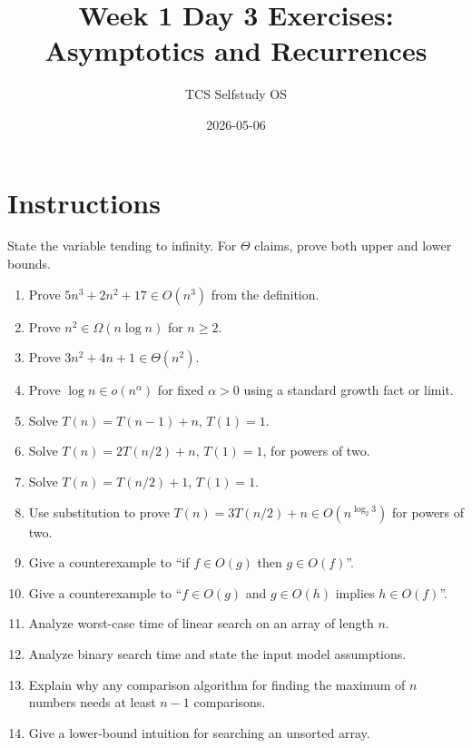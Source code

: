 \documentclass[11pt]{article}
\title{Week 1 Day 3 Exercises: Asymptotics and Recurrences}
\author{TCS Selfstudy OS}
\date{2026-05-06}
\begin{document}
\maketitle

\section*{Instructions}
State the variable tending to infinity. For $\Theta$ claims, prove both upper and lower bounds.

\begin{enumerate}[label=\textbf{D3.\arabic*.}]
\item Prove $5n^3+2n^2+17\in O(n^3)$ from the definition.
\item Prove $n^2\in\Omega(n\log n)$ for $n\ge2$.
\item Prove $3n^2+4n+1\in\Theta(n^2)$.
\item Prove $\log n\in o(n^\alpha)$ for fixed $\alpha>0$ using a standard growth fact or limit.
\item Solve $T(n)=T(n-1)+n$, $T(1)=1$.
\item Solve $T(n)=2T(n/2)+n$, $T(1)=1$, for powers of two.
\item Solve $T(n)=T(n/2)+1$, $T(1)=1$.
\item Use substitution to prove $T(n)=3T(n/2)+n\in O(n^{\log_2 3})$ for powers of two.
\item Give a counterexample to ``if $f\in O(g)$ then $g\in O(f)$''.
\item Give a counterexample to ``$f\in O(g)$ and $g\in O(h)$ implies $h\in O(f)$''.
\item Analyze worst-case time of linear search on an array of length $n$.
\item Analyze binary search time and state the input model assumptions.
\item Explain why any comparison algorithm for finding the maximum of $n$ numbers needs at least $n-1$ comparisons.
\item Give a lower-bound intuition for searching an unsorted array.
\end{enumerate}
\end{document}
